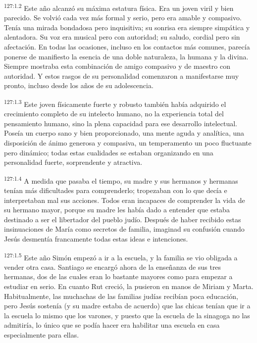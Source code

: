\par 
\textsuperscript{127:1.2} Este año alcanzó su máxima estatura física. Era un joven viril y bien parecido. Se volvió cada vez más formal y serio, pero era amable y compasivo. Tenía una mirada bondadosa pero inquisitiva; su sonrisa era siempre simpática y alentadora. Su voz era musical pero con autoridad; su saludo, cordial pero sin afectación. En todas las ocasiones, incluso en los contactos más comunes, parecía ponerse de manifiesto la esencia de una doble naturaleza, la humana y la divina. Siempre mostraba esta combinación de amigo compasivo y de maestro con autoridad. Y estos rasgos de su personalidad comenzaron a manifestarse muy pronto, incluso desde los años de su adolescencia.

\par 
\textsuperscript{127:1.3} Este joven físicamente fuerte y robusto también había adquirido el crecimiento completo de su intelecto humano, no la experiencia total del pensamiento humano, sino la plena capacidad para ese desarrollo intelectual. Poseía un cuerpo sano y bien proporcionado, una mente aguda y analítica, una disposición de ánimo generosa y compasiva, un temperamento un poco fluctuante pero dinámico; todas estas cualidades se estaban organizando en una personalidad fuerte, sorprendente y atractiva.

\par 
\textsuperscript{127:1.4} A medida que pasaba el tiempo, su madre y sus hermanos y hermanas tenían más dificultades para comprenderlo; tropezaban con lo que decía e interpretaban mal sus acciones. Todos eran incapaces de comprender la vida de su hermano mayor, porque su madre les había dado a entender que estaba destinado a ser el libertador del pueblo judío. Después de haber recibido estas insinuaciones de María como secretos de familia, imaginad su confusión cuando Jesús desmentía francamente todas estas ideas e intenciones.

\par 
\textsuperscript{127:1.5} Este año Simón empezó a ir a la escuela, y la familia se vio obligada a vender otra casa. Santiago se encargó ahora de la enseñanza de sus tres hermanas, dos de las cuales eran lo bastante mayores como para empezar a estudiar en serio. En cuanto Rut creció, la pusieron en manos de Miriam y Marta. Habitualmente, las muchachas de las familias judías recibían poca educación, pero Jesús sostenía (y su madre estaba de acuerdo) que las chicas tenían que ir a la escuela lo mismo que los varones, y puesto que la escuela de la sinagoga no las admitiría, lo único que se podía hacer era habilitar una escuela en casa especialmente para ellas.

